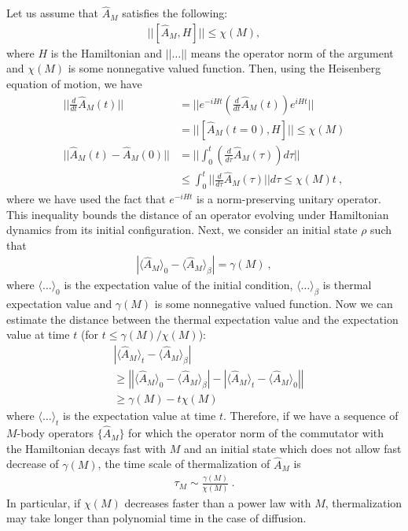 \documentclass[twocolumn,superscriptaddress, prl,showpacs]{revtex4-1}
\begin{document}
Let us assume that $\hat{A}_M$ satisfies the following:
\begin{align}
||[\hat{A}_M, H]|| \leq \chi(M),
\end{align}
where $H$ is the Hamiltonian and $||\ldots||$ means the operator norm of the argument and $\chi(M)$ is some nonnegative valued function.
Then, using the Heisenberg equation of motion, we have
\begin{align}
\bigg|\bigg|\frac{d}{dt} \hat{A}_M(t)\bigg|\bigg| &= \bigg|\bigg| e^{-i H t} \left(\frac{d}{dt} \hat{A}_M (t)\right) e^{i H t} \bigg|\bigg| \nonumber\\
&= ||[\hat{A}_M(t = 0), H]|| \leq \chi(M) \\
||\hat{A}_M(t) - \hat{A}_M(0)|| &= \bigg|\bigg|\int_0^t \left(\frac{d}{d\tau} \hat{A}_M(\tau)\right)d\tau \bigg|\bigg| \nonumber\\
&\leq \int^t_0 \big|\big|\frac{d}{d\tau} \hat{A}_M(\tau)\big|\big|d\tau \leq \chi(M) t ~,
\end{align}
where we have used the fact that $e^{-iHt}$ is a norm-preserving unitary operator.
This inequality bounds the distance of an operator evolving under Hamiltonian dynamics
from its initial configuration. Next, we consider an initial state $\rho$ such that
\begin{align}
|\langle \hat{A}_M \rangle_0 - \langle \hat{A}_M \rangle_\beta| = \gamma(M) ~,
\end{align}
where $\langle \ldots \rangle_0$ is the expectation value of the initial condition, $\langle \ldots \rangle_\beta$
is thermal expectation value and $\gamma(M)$ is some nonnegative valued function.
Now we can estimate the distance between the thermal expectation value and the expectation value at time $t$ (for $t \leq \gamma(M)/\chi(M)$):
\begin{align}
&|\langle \hat{A}_M \rangle_t - \langle \hat{A}_M \rangle_\beta| \nonumber\\
&\geq \left | |\langle \hat{A}_M\rangle_0 - \langle \hat{A}_M\rangle_\beta | -|\langle \hat{A}_M\rangle_t - \langle \hat{A}_M\rangle_0 |\right | \nonumber\\
&\geq \gamma(M) - t \chi(M)
\end{align}
where $\langle \ldots \rangle_t$ is the expectation value at time $t$.
Therefore, if we have a sequence of $M$-body operators $\{ \hat{A}_M \}$
for which the operator norm of the commutator with the Hamiltonian decays fast with $M$
and an initial state which does not allow fast decrease of $\gamma(M)$,
the time scale of thermalization of $\hat{A}_M$ is
\begin{align}
\tau_M \sim \frac{\gamma(M)}{\chi(M)} ~.
\end{align}
In particular, if $\chi(M)$ decreases faster than a power law with $M$,
thermalization may take longer than polynomial time in the case of diffusion.
\end{document}
